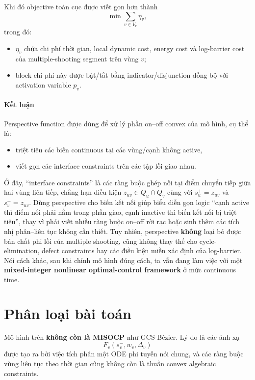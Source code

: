 \documentclass[12pt]{article}
\begin{document}
Khi đó objective toàn cục được viết gọn hơn thành
\begin{equation}
\min \sum_{v\in V_r} \eta_v,
\label{eq:recommended-clean-objective}
\end{equation}
trong đó:
\begin{itemize}
    \item $\eta_v$ chứa chi phí thời gian, local dynamic cost, energy cost và log-barrier cost của multiple-shooting segment trên vùng $v$;
    \item block chi phí này được bật/tắt bằng indicator/disjunction đồng bộ với activation variable $p_v$.
\end{itemize}

\paragraph{Kết luận}
Perspective function được dùng để xử lý phần on--off convex của mô hình, cụ thể là:
\begin{itemize}
    \item triệt tiêu các biến continuous tại các vùng/cạnh không active,
    \item viết gọn các interface constraints trên các tập lồi giao nhau.
\end{itemize}
Ở đây, ``interface constraints'' là các ràng buộc ghép nối tại điểm chuyển tiếp giữa hai vùng liên tiếp, chẳng hạn điều kiện $z_{uv}\in Q_u\cap Q_v$ cùng với $s_u^+=z_{uv}$ và $s_v^-=z_{uv}$. Dùng perspective cho biến kết nối giúp biểu diễn gọn logic ``cạnh active thì điểm nối phải nằm trong phần giao, cạnh inactive thì biến kết nối bị triệt tiêu'', thay vì phải viết nhiều ràng buộc on--off rời rạc hoặc sinh thêm các tích nhị phân--liên tục không cần thiết.
Tuy nhiên, perspective \textbf{không} loại bỏ được bản chất phi lồi của multiple shooting, cũng không thay thế cho cycle-elimination, defect constraints hay các điều kiện miền xác định của log-barrier. Nói cách khác, sau khi chỉnh mô hình đúng cách, ta vẫn đang làm việc với một \textbf{mixed-integer nonlinear optimal-control framework} ở mức continuous time.

\section{Phân loại bài toán}

Mô hình trên \textbf{không còn là MISOCP} như GCS-B\'ezier. Lý do là các ánh xạ
\[
F_v(s_v^-,w_v,\Delta_v)
\]
được tạo ra bởi việc tích phân một ODE phi tuyến nói chung, và các ràng buộc vùng liên tục theo thời gian cũng không còn là thuần convex algebraic constraints.
\end{document}
